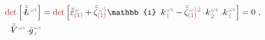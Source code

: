 \begin{subequations} \label{eq:nonlinear(2)-wave_wkrho-simplify6'}
\begin{align}
	\textcolor{Maroon}{\det} \left[ \Xint{\mathcolor{gray}{-}}{32}{\bar{\bar{L}}}^{\;\! \mathcolor{gray}{\omega} \textcolor{ForestGreen}{\imath}} \right] &= \textcolor{Maroon}{\det} \left[ \bar{\bar{\varepsilon}}^{\;\! \mathcolor{gray}{\omega}}_{\textcolor{Maroon}{(1)}} + \bar{\bar{\zeta}}^{\;\! \mathcolor{gray}{\omega} \mathcolor{gray}{\check{1}}}_{\textcolor{Maroon}{(1)}} \mathbb{i} \Xint{\begin{smallmatrix} ~ \\ {}^{}_{\mathcolor{gray}{-}} \\ ~ \end{smallmatrix}}{15}{k}_{\;\! \mathcolor{gray}{\check{1}}}^{\;\! \mathcolor{gray}{\omega} \textcolor{ForestGreen}{\imath}} - \bar{\bar{\zeta}}^{\;\! \mathcolor{gray}{\omega} \mathcolor{gray}{\check{1} \check{2}}}_{\textcolor{Maroon}{(1)}} \Xint{\begin{smallmatrix} ~ \\ {}^{}_{\mathcolor{gray}{-}} \\ ~ \end{smallmatrix}}{15}{k}_{\;\! \mathcolor{gray}{\check{2}}}^{\;\! \mathcolor{gray}{\omega} \textcolor{ForestGreen}{\imath}} \Xint{\begin{smallmatrix} ~ \\ {}^{}_{\mathcolor{gray}{-}} \\ ~ \end{smallmatrix}}{15}{k}_{\;\! \mathcolor{gray}{\check{1}}}^{\;\! \mathcolor{gray}{\omega} \textcolor{ForestGreen}{\imath}} \right] = 0 ~, \label{eq:nonlinear(2)-wave_wkrho-simplify6-L3'} \\
	\Xint{\mathcolor{gray}{-}}{25}{\bar{\bar{V}}}^{\;\! \mathcolor{gray}{\omega} \textcolor{ForestGreen}{\imath}} \Xint{{}^{}_{\mathcolor{gray}{-}}}{10}{\bar{g}}^{\;\!\mathcolor{gray}{\omega} \textcolor{ForestGreen}{\imath}}_{\;\! \mathcolor{gray}{z}}

\end{align}
\end{subequations}
